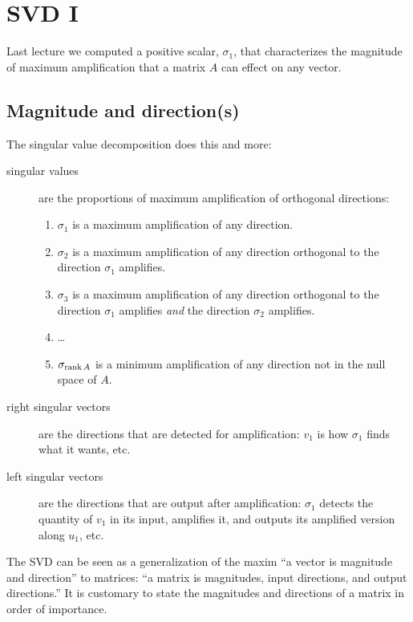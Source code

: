 \chapter{SVD I}
Last lecture we computed a positive scalar, \(\sigma_1\), that characterizes the magnitude of maximum amplification that a matrix \(A\) can effect on any vector.

\section{Magnitude and direction(s)}
The singular value decomposition does this and more:
\begin{description}
  \item[singular values]
  are the proportions of maximum amplification of orthogonal directions:
  \begin{enumerate}
    \item \(\sigma_1\) is a maximum amplification of any direction.
    \item \(\sigma_2\) is a maximum amplification of any direction orthogonal to the direction \(\sigma_1\) amplifies.
    \item \(\sigma_3\) is a maximum amplification of any direction orthogonal
    to the direction \(\sigma_1\) amplifies \emph{and}
    the direction \(\sigma_2\) amplifies.
    \item \ldots
    \item \(\sigma_{\rank A}\) is a minimum amplification of any direction not in the null space of \(A\).
  \end{enumerate}
  \item[right singular vectors]
  are the directions that are detected for amplification:
  \(v_1\) is how \(\sigma_1\) finds what it wants, etc.
  \item[left singular vectors]
  are the directions that are output after amplification:
  \(\sigma_1\) detects the quantity of \(v_1\) in its input, amplifies it, and outputs its amplified version along \(u_1\), etc.
\end{description}

The SVD can be seen as a generalization of the maxim ``a vector is magnitude and direction'' to matrices: ``a matrix is magnitudes, input directions, and output directions.''
It is customary to state the magnitudes and directions of a matrix in order of importance.

